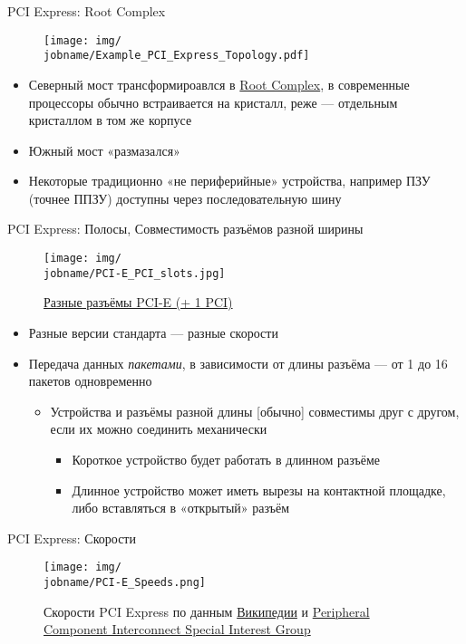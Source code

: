\documentclass[xetex,aspectratio=43]{beamer}
\begin{document}
\begin{frame}{PCI Express: Root Complex}
	\begin{figure}
        \texttt{[image: img/\\jobname/Example\_PCI\_Express\_Topology.pdf]}
    \end{figure}
    \begin{itemize}
        \item Северный мост трансформироавлся в \href{https://en.wikipedia.org/wiki/Root_complex}{Root Complex}, в современные процессоры обычно встраивается на кристалл, реже --- отдельным кристаллом в том же корпусе
        \item Южный мост «размазался»
        \item Некоторые традиционно «не периферийные» устройства, например ПЗУ (точнее ППЗУ) доступны через последовательную шину
    \end{itemize}
\end{frame}

\begin{frame}{PCI Express: Полосы, Совместимость разъёмов разной ширины}
	\begin{figure}
        \texttt{[image: img/\\jobname/PCI-E\_PCI\_slots.jpg]}
        \caption{\href{https://en.wikipedia.org/wiki/PCI_Express}{Разные разъёмы PCI-E (+ 1 PCI)}}
    \end{figure}
    \begin{itemize}
        \item Разные версии стандарта --- разные скорости
        \item Передача данных \emph{пакетами}, в зависимости от длины разъёма --- от 1 до 16 пакетов одновременно
        \begin{itemize}
            \item Устройства и разъёмы разной длины [обычно] совместимы друг с другом, если их можно соединить механически
            \begin{itemize}
                \item Короткое устройство будет работать в длинном разъёме
                \item Длинное устройство может иметь вырезы на контактной площадке, либо вставляться в «открытый» разъём
            \end{itemize}
        \end{itemize}
    \end{itemize}
\end{frame}

\begin{frame}{PCI Express: Скорости}
    \begin{figure}
        \texttt{[image: img/\\jobname/PCI-E\_Speeds.png]}
        \caption{Скорости PCI Express по данным \href{https://en.wikipedia.org/wiki/PCI\_Express\#History\_and\_revisions}{Википедии} и \href{https://web.archive.org/web/20131019114456/http://www.pcisig.com/news_room/faqs/pcie3.0\_faq/PCI-SIG\_PCIe\_3\_0\_FAQ\_Final\_07102012.pdf}{Peripheral Component Interconnect Special Interest Group}}
    \end{figure}
\end{frame}
\end{document}
